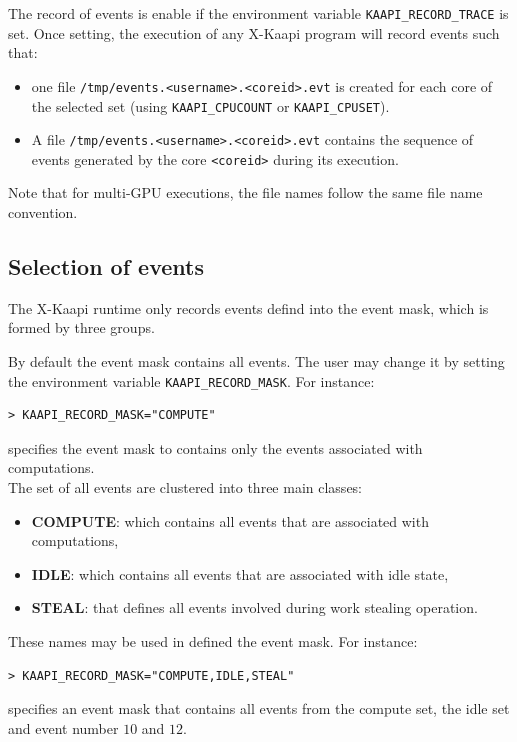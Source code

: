 \documentclass{article}[12pt]
\newcommand{\kaapi}{\textsc{X}-Kaapi\xspace}
\begin{document}
The record of events is enable if the environment variable \verb+KAAPI_RECORD_TRACE+ is set. Once setting, the execution of any \kaapi program will record events such that:
\begin{itemize} 
\item one file \verb+/tmp/events.<username>.<coreid>.evt+ is created for each core of the  selected set (using \verb+KAAPI_CPUCOUNT+ or \verb+KAAPI_CPUSET+). 
\item A file \verb+/tmp/events.<username>.<coreid>.evt+ contains the sequence of events generated by the core \verb+<coreid>+ during its execution. 
\end{itemize} 

Note that for multi-GPU executions, the file names follow the same file name convention.

\subsection{Selection of events}

The \kaapi runtime only records events defind into the event mask, which is formed by three groups.

By default the event mask contains all events. The user may change it  by setting the environment variable \verb+KAAPI_RECORD_MASK+. For instance:
\begin{verbatim}
> KAAPI_RECORD_MASK="COMPUTE"
\end{verbatim}
specifies the event mask to contains only the events associated with computations.\\

The set of all events are clustered into three main classes:
\begin{itemize}
\item \textbf{COMPUTE}: which contains all  events that are associated with computations,
\item \textbf{IDLE}: which contains all events that are associated with idle state,
\item \textbf{STEAL}: that defines all events involved during work stealing operation.
\end{itemize}
These names may be used in defined the event mask. For instance:
\begin{verbatim}
> KAAPI_RECORD_MASK="COMPUTE,IDLE,STEAL"
\end{verbatim}
specifies an event mask that contains all events from the compute set, the idle set and event number $10$ and $12$.
\end{document}
